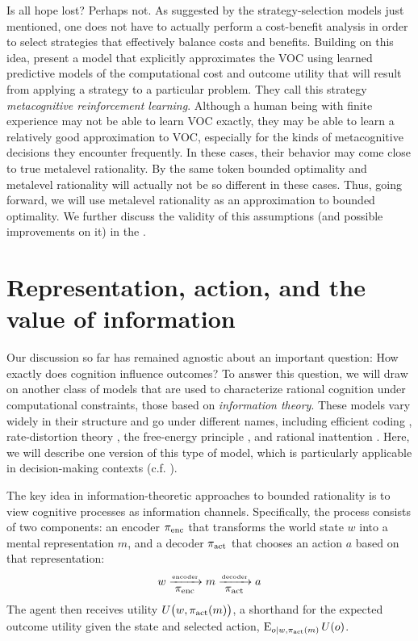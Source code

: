 
Is all hope lost? Perhaps not. As suggested by the strategy-selection models just mentioned, one does not have to actually perform a cost-benefit analysis in order to select strategies that effectively balance costs and benefits. Building on this idea, \citet{lieder2017strategy} present a model that explicitly approximates the VOC using learned predictive models of the computational cost and outcome utility that will result from applying a strategy to a particular problem. They call this strategy \emph{metacognitive reinforcement learning}. Although a human being with finite experience may not be able to learn VOC exactly, they may be able to learn a relatively good approximation to VOC, especially for the kinds of metacognitive decisions they encounter frequently. In these cases, their behavior may come close to true metalevel rationality. By the same token bounded optimality and metalevel rationality will actually not be so different in these cases. Thus, going forward, we will use metalevel rationality as an approximation to bounded optimality. We further discuss the validity of this assumptions (and possible improvements on it) in the .
 
\section{Representation, action, and the value of information}\label{sec:intro-info}

Our discussion so far has remained agnostic about an important question: How exactly does cognition influence outcomes? To answer this question, we will draw on another class of models that are used to characterize rational cognition under computational constraints, those based on \emph{information theory}. These models vary widely in their structure and go under different names, including efficient coding \citep{barlow1961possible,stocker2006noise}, rate-distortion theory \citep{sims2016rate}, the free-energy principle \citep{friston2010freeenergy}, and rational inattention \citep{sims2003implications}. Here, we will describe one version of this type of model, which is particularly applicable in decision-making contexts (c.f. \citealp{bhui2021resourcerational}).


The key idea in information-theoretic approaches to bounded rationality is to view cognitive processes as information channels. Specifically, the process consists of two components: an encoder $\pi_{\text{enc}}$ that transforms the world state $w$ into a mental representation $m$, and a decoder $\pi_{\text{act}}$ that chooses an action $a$ based on that representation:
\begin{equation}
  w \xrightarrow[{\displaystyle \pi_{\text{enc}}}]{\text{\tiny encoder}} m 
    \xrightarrow[{\displaystyle \pi_{\text{act}}}]{\text{\tiny decoder}} a
\end{equation}
The agent then receives utility $U \big(w, \pi_{\text{act}}(m) \big)$, a shorthand for the expected outcome utility given the state and selected action, $\operatorname*{E}_{o \mid w, \pi_{\text{act}}(m)} U(o)$.

